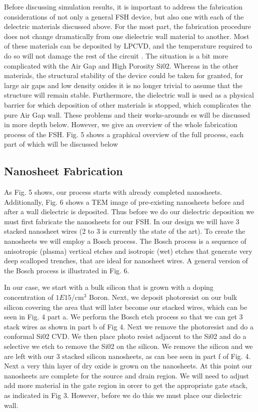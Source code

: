 \documentclass[letterpaper, 12 pt, conference]{ieeeconf}  %
\begin{document}
Before discussing simulation results, it is important to address the fabrication considerations of not only a general FSH device, but also one with each of the delectric materials discussed above. For the most part, the fabrication procedure does not change dramatically from one dielectric wall material to another. Most of these materials can be deposited by LPCVD, and the temperature required to do so will not damage the rest of the circuit \cite{c8} \cite{c9} \cite{c10} \cite{c11} \cite{c12}. The situation is a bit more complicated with the Air Gap and High Porosity Si02. Whereas in the other materials, the structural stability of the device could be taken for granted, for large air gaps and low density oxides it is no longer trivial to assume that the structure will remain stable. Furthermore, the dielectric wall is used as a physical barrier for which deposition of other materials is stopped, which complicates the pure Air Gap wall. These problems and their works-arounds es will be discussed in more depth below. However, we give an overview of the whole fabrication process of the FSH. Fig. 5 shows a graphical overview of the full process, each part of which will be discussed below


\subsection{Nanosheet Fabrication}

As Fig. 5 shows, our process starts with already completed nanosheets. Additionally, Fig. 6 shows a TEM image of pre-existing nanosheets before and after a wall dielectric is deposited. Thus before we do our dielectric deposition we must first fabricate the nanosheets for our FSH. In our design we will have 3 stacked nanosheet wires (2 to 3 is currently the state of the art). To create the nanosheets we will employ a Bosch process. The Bosch process is a sequence of anisotropic (plasma) vertical etches and isotropic (wet) etches that generate very deep scalloped trenches, that are ideal for nanosheet wires. A general version of the Bosch process is illustrated in Fig. 6. 

In our case, we start with a bulk silicon that is grown with a doping concentration of $1E15$/cm$^3$ Boron. Next, we deposit photoresist on our bulk silicon covering the area that will later become our stacked wires, which can be seen in Fig. 4 part a. We perform the Bosch etch process so that we can get 3 stack wires as shown in part b of Fig 4. Next we remove the photoresist and do a conformal Si02 CVD. We then place photo resist adjacent to the Si02 and do a selective we etch to remove the Si02 on the silicon. We remove the silicon and we are left with our 3 stacked silicon nanosheets, as can bee seen in part f of Fig. 4. Next a very thin layer of dry oxide is grown on the nanosheets. At this point our nanosheets are complete for the source and drain region. We will need to adjust add more material in the gate region in orcer to get the appropriate gate stack, as indicated in Fig 3. However, before we do this we must place our dielectric wall.
\end{document}
